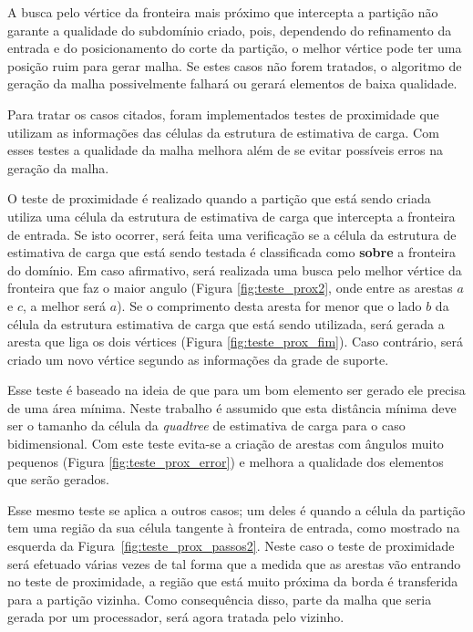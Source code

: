 A busca pelo vértice da fronteira mais próximo que intercepta a partição não garante a qualidade do subdomínio criado, pois, dependendo do refinamento da entrada e do posicionamento do corte da partição, o melhor vértice pode ter uma posição ruim para gerar malha. Se estes casos não forem tratados, o algoritmo de geração da malha possivelmente falhará ou gerará elementos de baixa qualidade.

Para tratar os casos citados, foram implementados testes de proximidade que utilizam as informações das células da estrutura de estimativa de carga. Com esses testes a qualidade da malha melhora além de se evitar possíveis erros na geração da malha.

O teste de proximidade é realizado quando a partição que está sendo criada utiliza uma célula da estrutura de estimativa de carga que intercepta a fronteira de entrada. Se isto ocorrer, será feita uma verificação se a célula da estrutura de estimativa de carga que está sendo testada é classificada como \textbf{sobre} a fronteira do domínio. Em caso afirmativo, será realizada uma busca pelo melhor vértice da fronteira que faz o maior angulo (Figura \ref{fig:teste_prox2}, onde entre as arestas $a$ e $c$, a melhor será $a$). Se o comprimento desta aresta for menor que o lado $b$ da célula da estrutura estimativa de carga que está sendo utilizada, será gerada a aresta que liga os dois vértices (Figura \ref{fig:teste_prox_fim}). Caso contrário, será criado um novo vértice segundo as informações da grade de suporte.

Esse teste é baseado na ideia de que para um bom elemento ser gerado ele precisa de uma área mínima. Neste trabalho é assumido que esta distância mínima deve ser o tamanho da célula da \textit{quadtree} de estimativa de carga para o caso bidimensional. Com este teste evita-se a criação de arestas com ângulos muito pequenos (Figura \ref{fig:teste_prox_error}) e melhora a qualidade dos elementos que serão gerados.

Esse mesmo teste se aplica a outros casos; um deles é quando a célula da partição tem uma região da sua célula tangente à fronteira de entrada, como mostrado na esquerda da Figura~\ref{fig:teste_prox_passos2}. Neste caso o teste de proximidade será efetuado várias vezes de tal forma que a medida que as arestas vão entrando no teste de proximidade, a região que está muito próxima da borda é transferida para a partição vizinha. Como consequência disso, parte da malha que seria gerada por um processador, será agora tratada pelo vizinho.


